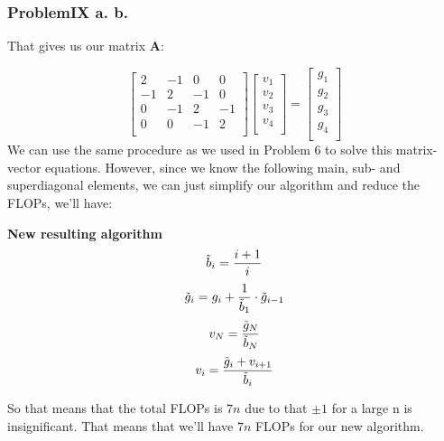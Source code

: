 \documentclass{article}
\begin{document}
\subsubsection*{ProblemIX a. b.}
That gives us our matrix \textbf{A}:

\begin{equation*}
\begin{bmatrix}
    2 & -1 & 0 & 0     \\ 
    -1 & 2 & -1 & 0    \\ 
    0 & -1 & 2 & -1    \\ 
    0 & 0 & -1 & 2     \\ 
\end{bmatrix}
\begin{bmatrix}
    v_1 \\
    v_2 \\
    v_3 \\
    v_4 \\
\end{bmatrix}
= 
\begin{bmatrix}
    g_1 \\
    g_2 \\
    g_3 \\
    g_4 \\
\end{bmatrix}
\end{equation*}
We can use the same procedure as we used in Problem 6 to solve this matrix-vector equations. However, since we know the following main, sub- and superdiagonal elements, we can just simplify our algorithm and reduce the FLOPs, we'll have:

\begin{tcolorbox}
\textbf{New resulting algorithm}
\begin{equation*}
    \Tilde{b}_i = \frac{i+1}{i}
\end{equation*}
\begin{equation*}
    \Tilde{g}_i = g_i +\frac{1}{\Tilde{b}_1}\cdot \Tilde{g}_{i-1} 
\end{equation*}
\begin{equation*}
    v_N = \frac{\Tilde{g}_N}{\Tilde{b}_N} 
\end{equation*}
\begin{equation*}
    v_i= \frac{\Tilde{g}_i+v_{i+1}}{\Tilde{b}_i} 
\end{equation*}
\end{tcolorbox}
\begin{flushleft}
So that means that the total FLOPs is $7n$ due to that $\pm 1$ for a large  n is insignificant. That means that we'll have $7n$ FLOPs for our new algorithm.
\end{flushleft}
\end{document}
